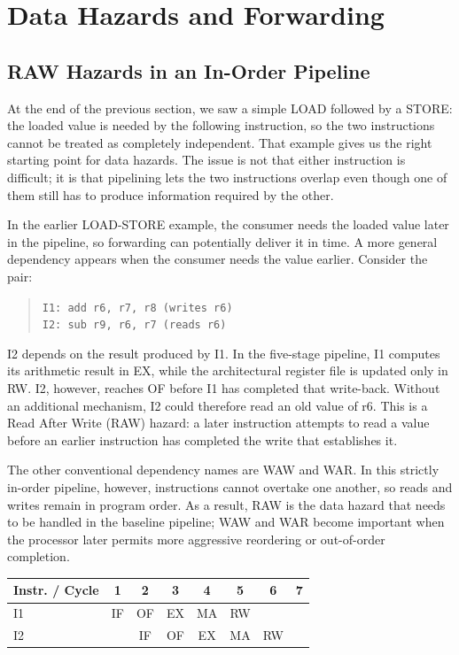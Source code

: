 \documentclass[11pt,a4paper]{report}
\begin{document}
\section{Data Hazards and Forwarding}
\label{sec:data-hazards}

\subsection{RAW Hazards in an In-Order Pipeline}

At the end of the previous section, we saw a simple LOAD followed by a STORE: the loaded value is needed by the following instruction, so the two instructions cannot be treated as completely independent. That example gives us the right starting point for data hazards. The issue is not that either instruction is difficult; it is that pipelining lets the two instructions overlap even though one of them still has to produce information required by the other.

In the earlier LOAD-STORE example, the consumer needs the loaded value later in the pipeline, so forwarding can potentially deliver it in time. A more general dependency appears when the consumer needs the value earlier. Consider the pair:

\begin{quote}
\texttt{I1: add r6, r7, r8 \quad (writes r6)} \\
\texttt{I2: sub r9, r6, r7 \quad (reads r6)}
\end{quote}

I2 depends on the result produced by I1. In the five-stage pipeline, I1 computes its arithmetic result in EX, while the architectural register file is updated only in RW. I2, however, reaches OF before I1 has completed that write-back. Without an additional mechanism, I2 could therefore read an old value of r6. This is a Read After Write (RAW) hazard: a later instruction attempts to read a value before an earlier instruction has completed the write that establishes it.

The other conventional dependency names are WAW and WAR. In this strictly in-order pipeline, however, instructions cannot overtake one another, so reads and writes remain in program order. As a result, RAW is the data hazard that needs to be handled in the baseline pipeline; WAW and WAR become important when the processor later permits more aggressive reordering or out-of-order completion.~\cite{cornell-hazards}

\begin{center}
\begin{tabular}{lccccccc}
\toprule
Instr. / Cycle & 1 & 2 & 3 & 4 & 5 & 6 & 7 \\
\midrule
I1 & IF & OF & EX & MA & RW & & \\
I2 & & IF & OF & EX & MA & RW & \\
\bottomrule
\end{tabular}
\end{center}
\end{document}
